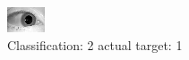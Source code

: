 \begin{figure}[h!]
\begin{center}
\includegraphics[width=0.60\columnwidth]{figures/ID1440_class_2_target_1.png}
\end{center}
\caption{ Classification: 2 actual target: 1}
\label{fig:ID1440_class_2_target_1}
\end{figure}
